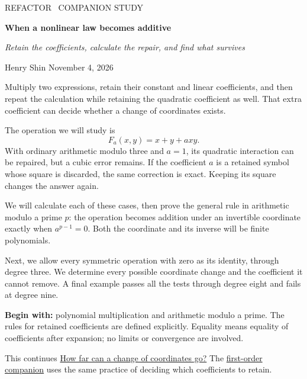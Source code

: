\documentclass[11pt,letterpaper]{article}
\numberwithin{equation}{section}
\theoremstyle{definition}\newtheorem{example}[theorem]{Example}
\begin{document}
\color{ink}
\thispagestyle{empty}
{\sffamily\small\textcolor{accent}{REFACTOR \textperiodcentered\ COMPANION STUDY}\par}
\vspace{.6em}
{\LARGE\bfseries When a nonlinear law becomes additive\par}
\vspace{.4em}
{\large\itshape Retain the coefficients, calculate the repair, and find what survives\par}
\vspace{.7em}
{Henry Shin \hspace{.6em}\textperiodcentered\hspace{.6em} November 4, 2026\par}
\vspace{.6em}

Multiply two expressions, retain their constant and linear coefficients, and then repeat the calculation while retaining the quadratic coefficient as well. That extra coefficient can decide whether a change of coordinates exists.

The operation we will study is
\[
 F_a(x,y)=x+y+a xy.
\]
With ordinary arithmetic modulo three and \(a=1\), its quadratic interaction can be repaired, but a cubic error remains. If the coefficient \(a\) is a retained symbol whose square is discarded, the same correction is exact. Keeping its square changes the answer again.

We will calculate each of these cases, then prove the general rule in arithmetic modulo a prime \(p\): the operation becomes addition under an invertible coordinate exactly when \(a^{p-1}=0\). Both the coordinate and its inverse will be finite polynomials.

Next, we allow every symmetric operation with zero as its identity, through degree three. We determine every possible coordinate change and the coefficient it cannot remove. A final example passes all the tests through degree eight and fails at degree nine.

\textbf{Begin with:} polynomial multiplication and arithmetic modulo a prime. The rules for retained coefficients are defined explicitly. Equality means equality of coefficients after expansion; no limits or convergence are involved.

\vspace{.3em}
{\small This continues \href{https://refactor.press/refactors/coordinate-repair}{How far can a change of coordinates go?} The \href{https://refactor.press/refactors/first-order}{first-order companion} uses the same practice of deciding which coefficients to retain.}
\end{document}
